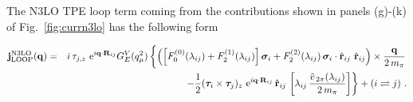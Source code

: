 \documentclass[aps,prc,floatfix,showpacs,twocolumn, preprintnumbers]{revtex4-2}
\begin{document}
The N3LO TPE loop term coming from the contributions shown in panels (g)-(k) of Fig.~\ref{fig:currn3lo} has the following form
\begin{widetext}
\begin{eqnarray}
{\bf j}^{{\rm N3LO}}_{\rm LOOP}({\bf q})&=&
i\,\tau_{j,z}\,\, {\rm e}^{i{\bf q}\cdot {\bf R}_{ij}}G^V_E(q_{\mu}^2)
\left\{ \left(
\left[ F^{(0)}_0(\lambda_{ij})  + F^{(1)}_2(\lambda_{ij})\right]{\bm \sigma}_i 
+ F^{(2)}_2(\lambda_{ij})\,   {\bm \sigma}_i\cdot\hat{\bf r}_{ij} \,\, \hat{\bf r}_{ij}
 \right) \times \frac{{\bf q}}{2\, m_\pi}  \right. \nonumber\\
&&\left. \hspace{-0.2cm}-\frac{1}{2} ({\bm \tau}_i\times {\bm \tau}_j)_z\,\,  {\rm e}^{i{\bf q}\cdot {\bf R}_{ij}} \,\hat{\bf r}_{ij}\,
\left[ \lambda_{ij}\, \frac{\tilde{v}_{\,2\pi}(\lambda_{ij})}{2\,m_\pi} \right]\right\}
+ (i \rightleftharpoons j) \ . \label{eq:jloop}
\end{eqnarray}
\end{widetext}
\end{document}
